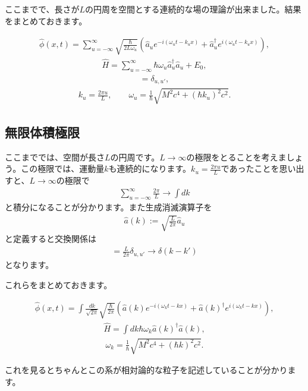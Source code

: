 \documentclass[report,paper=a4, fontsize=12pt, line_length=16cm, number_of_lines=33,dvipdfmx]{jlreq}
\newenvironment{important}{\begin{tcolorbox}[
  colback = white,
  colframe = red!35,
  boxrule = 2mm,
  fonttitle = \bfseries,
  after = \noindent] }{\end{tcolorbox}}
\numberwithin{equation}{chapter}
\newcommand{\phih}{\hat{\phi}}
\newcommand{\Hh}{\widehat{H}}
\newcommand{\ah}{\hat{a}}
\begin{document}
ここまでで、長さが$L$の円周を空間とする連続的な場の理論が出来ました。結果をまとめておきます。
\begin{important}
  \begin{align}
    \phih(x,t)=\sum_{u=-\infty}^{\infty}\sqrt{\frac{\hbar}{2L\omega_{u}}}(\ah_{u}e^{-i(\omega_ut-k_ux)}
    +\ah^{\dag}_{u}e^{i(\omega_ut-k_ux)}),
  \end{align}
  \begin{align}
    \Hh=\sum_{u=-\infty}^{\infty}\hbar \omega_{u}\ah_{u}^{\dag}\ah_{u}+E_0,
  \end{align}
  \begin{align}
    [\ah_{u},\ah_{u'}^{\dag}]=\delta_{u,u'},
  \end{align}
  \begin{align}
    k_u=\frac{2\pi u}{L},\qquad \omega_{u}=\frac{1}{\hbar}
    \sqrt{M^2c^4+(\hbar k_u)^2c^2}.
  \end{align}
\end{important}

\subsection{無限体積極限}
ここまででは、空間が長さ$L$の円周です。$L\to \infty$の極限をとることを考えましょう。この極限では、運動量$k$も連続的になります。$k_u=\frac{2\pi u}{L}$であったことを思い出すと、$L\to\infty$の極限で
\begin{align}
  \sum_{u=-\infty}^{\infty}\frac{2\pi}{L}\to \int dk
\end{align}
と積分になることが分かります。また生成消滅演算子を
\begin{align}
  \ah(k):=\sqrt{\frac{L}{2\pi}}\ah_{u}
\end{align}
と定義すると交換関係は
\begin{align}
  [\ah(k),\ah(k')^{\dag}]=\frac{L}{2\pi}\delta_{u,u'}\to \delta(k-k')
\end{align}
となります。

これらをまとめておきます。
\begin{important}
  \begin{align}
    \phih(x,t)=\int\frac{dk}{\sqrt{2\pi}}\sqrt{\frac{\hbar}{2\pi}}(\ah(k)e^{-i(\omega_{k}t-kx)} + \ah(k)^{\dag}e^{i(\omega_kt-kx)}),
  \end{align}
  \begin{align}
    \Hh=\int dk \hbar \omega_{k}\ah(k)^{\dag}\ah(k),
  \end{align}
  \begin{align}
    \omega_{k}=\frac{1}{\hbar}\sqrt{M^2c^4+(\hbar k)^2c^2}.
  \end{align}
\end{important}
これを見るとちゃんとこの系が相対論的な粒子を記述していることが分かります。
\end{document}
